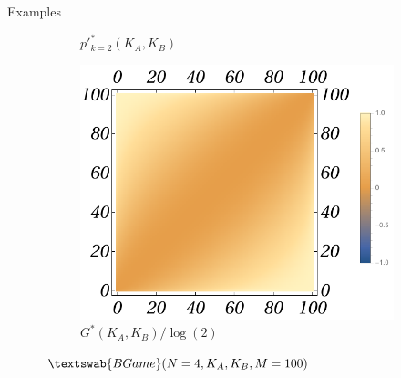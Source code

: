 \documentclass{beamer}
\theoremstyle{definition}
\newcommand{\BG}[1]{$\textswab{BGame}(#1)$}
\begin{document}
\begin{frame}[shrink=20]{Examples}
\begin{figure}[H]
\begin{subfigure}[b]{0.3\textwidth}
        \caption{\small \centering $p'^*_{k=2}(K_A,K_B)$}
        \label{fig:BGame4__100_ppk_2}
    \end{subfigure}
    \hfill %
    \begin{subfigure}[b]{0.3\textwidth}
        \includegraphics[width=\textwidth]{img/GB_Plot_4_100.pdf}
        \caption{\small \centering $G^*(K_A,K_B)/\log(2)$}
        \label{fig:BGame4__100_G}
    \end{subfigure}
    
    \caption{\small \centering \BG{N=4,K_A,K_B,M=100}}
    \label{fig:BGame4__100_PppkG}
\end{figure}
\end{frame}
\end{document}
